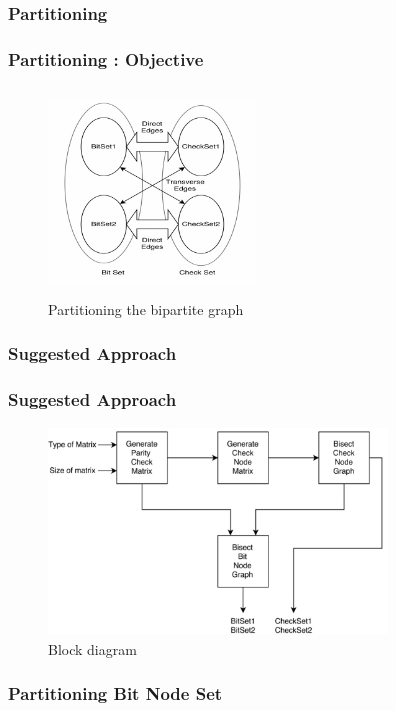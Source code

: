 \documentclass[xcolor=dvipsname]
{beamer}
\begin{document}
\subsubsection{Partitioning }
\begin{frame}[t] 
		\frametitle{ Partitioning : Objective }
		\begin{figure}
		\includegraphics[height=5.5cm,width=5.5cm]{partition}
				\caption{Partitioning the bipartite graph}
			\end{figure}
	\end{frame}		
	

	
\subsubsection{Suggested Approach}
			\begin{frame}[t] 
		\frametitle{ Suggested Approach }
	
		\begin{figure}
		\hspace{-10mm}
		\includegraphics[height=5.5cm,width=9cm]{block.jpg}
				\caption{ Block diagram }
			\end{figure}
		
	\end{frame}	


\subsubsection{Partitioning Bit Node Set }
\end{document}
